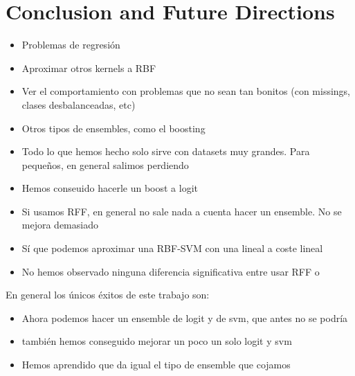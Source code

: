 
\chapter{Conclusion and Future Directions} %

\label{Chapter5} %


\begin{note}
  \begin{itemize}
    \item Problemas de regresión
    \item Aproximar otros kernels a RBF
    \item Ver el comportamiento con problemas que no sean tan bonitos (con
    missings, clases desbalanceadas, etc)
    \item Otros tipos de ensembles, como el boosting
  \end{itemize}
\end{note}

\begin{note}
  \begin{itemize}
  \item Todo lo que hemos hecho solo sirve con datasets muy grandes. Para
  pequeños, en general salimos perdiendo
  \item Hemos conseuido hacerle un boost a logit
  \item Si usamos RFF, en general no sale nada a cuenta hacer un
  ensemble. No se mejora demasiado
  \item Sí que podemos aproximar una RBF-SVM con una lineal a coste lineal
  \item No hemos observado ninguna diferencia significativa entre usar RFF
  o \Nys\ 
\end{itemize}

En general los únicos éxitos de este trabajo son:
\begin{itemize}
  \item Ahora podemos hacer un ensemble de logit y de svm, que antes no se podría
  \item también hemos conseguido mejorar un poco un solo logit y svm
  \item Hemos aprendido que da igual el tipo de ensemble que cojamos
\end{itemize}
\end{note}
